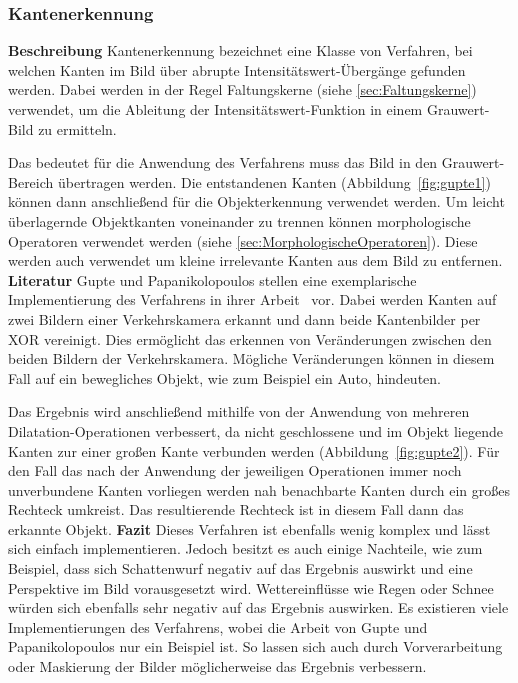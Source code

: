 \subsubsection{Kantenerkennung}
\textbf{Beschreibung}\newline
Kantenerkennung bezeichnet eine Klasse von Verfahren, bei welchen Kanten im Bild über abrupte Intensitätswert-Übergänge gefunden werden. 
Dabei werden in der Regel Faltungskerne (siehe \ref{sec:Faltungskerne}) verwendet, um die Ableitung der Intensitätswert-Funktion in einem Grauwert-Bild zu ermitteln.

Das bedeutet für die Anwendung des Verfahrens muss das Bild in den Grauwert-Bereich übertragen werden.
Die entstandenen Kanten (Abbildung~\ref{fig:gupte1}) können dann anschließend für die Objekterkennung verwendet werden. 
Um leicht überlagernde Objektkanten voneinander zu trennen können morphologische Operatoren verwendet werden (siehe \ref{sec:MorphologischeOperatoren}).
Diese werden auch verwendet um kleine irrelevante Kanten aus dem Bild zu entfernen.
\newline\newline
\textbf{Literatur}\newline
Gupte und Papanikolopoulos stellen eine exemplarische Implementierung  des Verfahrens in ihrer Arbeit~\cite{gupte2000algorithms} vor. 
Dabei werden Kanten auf zwei Bildern einer Verkehrskamera erkannt und dann beide Kantenbilder per XOR vereinigt. 
Dies ermöglicht das erkennen von Veränderungen zwischen den beiden Bildern der Verkehrskamera.
Mögliche Veränderungen können in diesem Fall auf ein bewegliches Objekt, wie zum Beispiel ein Auto, hindeuten.

Das Ergebnis wird anschließend mithilfe von der Anwendung von mehreren Dilatation-Operationen verbessert, da nicht geschlossene und im Objekt liegende Kanten zur einer großen Kante verbunden werden (Abbildung~\ref{fig:gupte2}).
Für den Fall das nach der Anwendung der jeweiligen Operationen immer noch unverbundene Kanten vorliegen werden nah benachbarte Kanten durch ein großes Rechteck umkreist.
Das resultierende Rechteck ist in diesem Fall dann das erkannte Objekt.
\newline\newline
\textbf{Fazit}\newline
Dieses Verfahren ist ebenfalls wenig komplex und lässt sich einfach implementieren. 
Jedoch besitzt es auch einige Nachteile, wie zum Beispiel, dass sich Schattenwurf negativ auf das Ergebnis auswirkt und eine Perspektive im Bild vorausgesetzt wird.
Wettereinflüsse wie Regen oder Schnee würden sich ebenfalls sehr negativ auf das Ergebnis auswirken.
Es existieren viele Implementierungen des Verfahrens, wobei die Arbeit von Gupte und Papanikolopoulos nur ein Beispiel ist.
So lassen sich auch durch Vorverarbeitung oder Maskierung der Bilder möglicherweise das Ergebnis verbessern.

